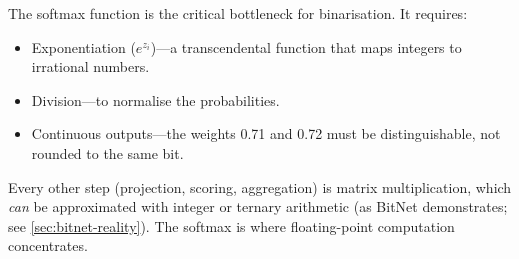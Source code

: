 \begin{keyinsight}
The softmax function is the critical bottleneck for binarisation.
It requires:
\begin{itemize}[leftmargin=1em]
  \item Exponentiation ($e^{z_i}$)---a transcendental function that
    maps integers to irrational numbers.
  \item Division---to normalise the probabilities.
  \item Continuous outputs---the weights 0.71 and 0.72 must be
    distinguishable, not rounded to the same bit.
\end{itemize}
Every other step (projection, scoring, aggregation) is matrix
multiplication, which \emph{can} be approximated with integer or
ternary arithmetic (as BitNet demonstrates;
see \cref{sec:bitnet-reality}). The softmax is where
floating-point computation concentrates.
\end{keyinsight}

